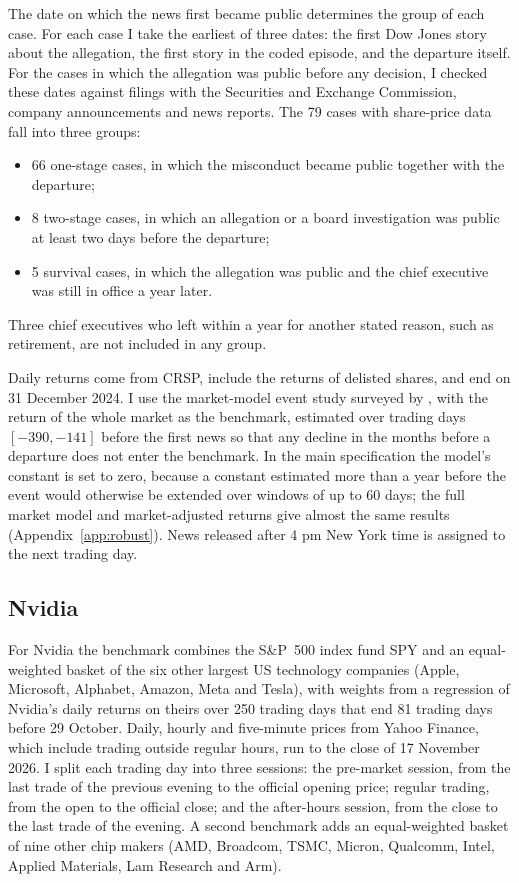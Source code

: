 \documentclass[11pt,a4paper]{article}
\begin{document}
The date on which the news first became public determines the group of each case. For each case I take the earliest of three dates: the first Dow Jones story about the allegation, the first story in the coded episode, and the departure itself. For the cases in which the allegation was public before any decision, I checked these dates against filings with the Securities and Exchange Commission, company announcements and news reports. The 79 cases with share-price data fall into three groups:
\begin{itemize}\itemsep0pt
\item 66 one-stage cases, in which the misconduct became public together with the departure;
\item 8 two-stage cases, in which an allegation or a board investigation was public at least two days before the departure;
\item 5 survival cases, in which the allegation was public and the chief executive was still in office a year later.
\end{itemize}
Three chief executives who left within a year for another stated reason, such as retirement, are not included in any group.

Daily returns come from CRSP, include the returns of delisted shares, and end on 31 December 2024. I use the market-model event study surveyed by \citet{mackinlay1997}, with the return of the whole market as the benchmark, estimated over trading days $[-390,-141]$ before the first news so that any decline in the months before a departure does not enter the benchmark. In the main specification the model's constant is set to zero, because a constant estimated more than a year before the event would otherwise be extended over windows of up to 60 days; the full market model and market-adjusted returns give almost the same results (Appendix~\ref{app:robust}). News released after 4 pm New York time is assigned to the next trading day.

\subsection{Nvidia}

For Nvidia the benchmark combines the S\&P~500 index fund SPY and an equal-weighted basket of the six other largest US technology companies (Apple, Microsoft, Alphabet, Amazon, Meta and Tesla), with weights from a regression of Nvidia's daily returns on theirs over 250 trading days that end 81 trading days before 29 October. Daily, hourly and five-minute prices from Yahoo Finance, which include trading outside regular hours, run to the close of 17 November 2026. I split each trading day into three sessions: the pre-market session, from the last trade of the previous evening to the official opening price; regular trading, from the open to the official close; and the after-hours session, from the close to the last trade of the evening. A second benchmark adds an equal-weighted basket of nine other chip makers (AMD, Broadcom, TSMC, Micron, Qualcomm, Intel, Applied Materials, Lam Research and Arm).
\end{document}
